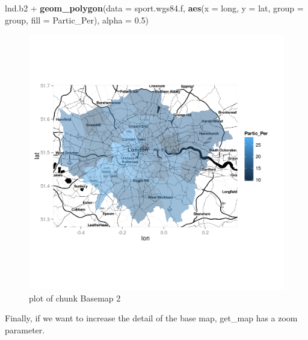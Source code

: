 \documentclass[]{article}
\makeatletter
\newenvironment{Shaded}{}{}
\newcommand{\KeywordTok}[1]{\textcolor[rgb]{0.00,0.44,0.13}{\textbf{{#1}}}}
\newcommand{\DataTypeTok}[1]{\textcolor[rgb]{0.56,0.13,0.00}{{#1}}}
\newcommand{\FloatTok}[1]{\textcolor[rgb]{0.25,0.63,0.44}{{#1}}}
\newcommand{\NormalTok}[1]{{#1}}
\def\maxwidth{\ifdim\Gin@nat@width>\linewidth\linewidth
\else\Gin@nat@width\fi}
\let\Oldincludegraphics\includegraphics
\renewcommand{\includegraphics}[1]{\Oldincludegraphics[width=\maxwidth]{#1}}
\makeatother
\begin{document}
\begin{Shaded}
\begin{Highlighting}[]
\NormalTok{lnd.b2 + }\KeywordTok{geom_polygon}\NormalTok{(}\DataTypeTok{data =} \NormalTok{sport.wgs84.f, }\KeywordTok{aes}\NormalTok{(}\DataTypeTok{x =} \NormalTok{long, }\DataTypeTok{y =} \NormalTok{lat, }\DataTypeTok{group =} \NormalTok{group, }
    \DataTypeTok{fill =} \NormalTok{Partic_Per), }\DataTypeTok{alpha =} \FloatTok{0.5}\NormalTok{)}
\end{Highlighting}
\end{Shaded}
\begin{figure}[htbp]
\centering
\includegraphics{figure/Basemap_2.png}
\caption{plot of chunk Basemap 2}
\end{figure}

Finally, if we want to increase the detail of the base map, get\_map has
a zoom parameter.
\end{document}

